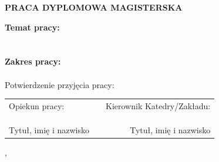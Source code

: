 {  \begin{center}
    \vspace{1cm}
    \Large{\textbf{\uppercase{Praca dyplomowa magisterska}}}
  \end{center}
  \vspace{1cm}
	
		\noindent\textbf{Temat pracy:} \\
		\@title\\
		\\
		\noindent\textbf{Zakres pracy:} \\
		\@descr\\
		
		\vspace{2.5cm}
		\noindent{}Potwierdzenie przyjęcia pracy:
		\vspace{1cm}
		
		\noindent
		\begin{tabular}{@{}lp{5cm}r@{}}
			Opiekun pracy: & & Kierownik Katedry/Zakładu: \\ \\ \\ \\
			Tytuł, imię i nazwisko & & Tytuł, imię i nazwisko
		\end{tabular}
		
		\begin{center}
			\@miasto, \@date
		\end{center}
	
	\pagebreak
	\addtolength{\hoffset}{0.5cm}
	\addtolength{\voffset}{1.5cm}
	\addtolength{\textwidth}{-0.5cm}
}

\makeatother

\cleardoublepage